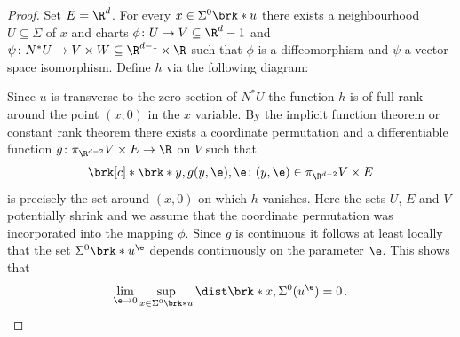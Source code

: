 \begin{proof}
  Set $E=\R^d$.
  For every $x\in \Sigma^0\brk*{u}$ there exists
  a neighbourhood $U\subseteq\Sigma$ of $x$ and charts
  $\phi\colon U\to V\subseteq\R^d-1$ and $\psi\colon N^*U\to V\times W\subseteq\R^{d-1}\times\R$
  such that $\phi$ is a diffeomorphism and $\psi$ a vector space isomorphism.
  Define $h$ via the following diagram:
  \begin{center}
    \tikzset{external/export next=false}
  \end{center}
  Since $u$ is transverse to the zero section of $N^*U$ the function $h$ is of full rank around the
  point $(x,0)$ in the $x$ variable.
  By the implicit function theorem or constant rank theorem there exists  a coordinate permutation
  and a differentiable function $g\colon \pi_{\R^{d-2}}V\times E\to \R$ on $V$ such that
  \begin{align}
    \brk[c]*{\brk*{y,g(y,\e),\e}\colon (y,\e)\in \pi_{\R^{d-2}}V\times E}
  \end{align}
  is precisely the set around $(x,0)$ on which $h$ vanishes.
  Here the sets $U$, $E$ and $V$ potentially shrink and we assume that the coordinate permutation was incorporated into the
  mapping $\phi$. Since $g$ is continuous it follows at least locally that the
  set $\Sigma^0\brk*{u^\e}$ depends continuously on the parameter $\e$.
  This shows that
  \begin{align}
    \lim_{\e\to0}\sup_{x\in\Sigma^0\brk*{u}}\dist\brk*{x,\Sigma^0(u^\e)}=0\,.
    \label{eq:convergence_Sigma0_limsup1}
  \end{align}


\end{proof}
